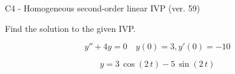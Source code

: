 \begin{exercise}
  \begin{exerciseTitle}C4 - Homogeneous second-order linear IVP (ver. 59)\end{exerciseTitle}
  \begin{exerciseStatement}
    
Find the solution to the given IVP.

    
\[y''+4y = 0 \hspace{1em} y(0) = 3 , y'(0) = -10\]

  \end{exerciseStatement}
  \begin{exerciseAnswer}
    
\[y= 3 \, \cos\left(2 \, t\right) - 5 \, \sin\left(2 \, t\right)\]

  \end{exerciseAnswer}
\end{exercise}